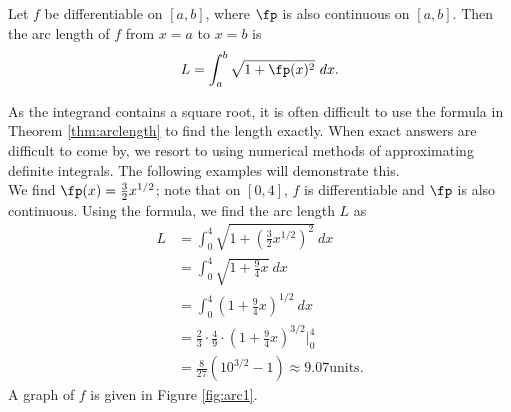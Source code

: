{Let $f$ be differentiable on $[a,b]$, where $\fp$ is also continuous on $[a,b]$. Then the arc length of $f$ from $x=a$ to $x=b$ is
$$L = \int_a^b \sqrt{1+\fp(x)^2}\ dx.$$
}

As the integrand contains a square root, it is often difficult to use the formula in Theorem \ref{thm:arclength} to find the length exactly. When exact answers are difficult to come by, we resort to using numerical methods of approximating definite integrals. The following examples will demonstrate this.\\

{We find $\fp(x)= \frac32x^{1/2}$; note that on $[0,4]$, $f$ is differentiable  and $\fp$ is also continuous. Using the formula, we find the arc length $L$ as
\begin{align*}
	L &=	\int_0^4 \sqrt{1+\left(\frac32x^{1/2}\right)^2}\ dx \\
		&=	\int_0^4 \sqrt{1+\frac94x} \ dx \\
		&= 	\int_0^4 \left(1+\frac94x\right)^{1/2}\ dx \\
		&=  \frac23\cdot\frac49\cdot\left(1+\frac94x\right)^{3/2}\Big|_0^4 \\
		&=\frac{8}{27}\left(10^{3/2}-1\right) \approx 9.07 \text{units}.
\end{align*}
	A graph of $f$ is given in Figure \ref{fig:arc1}. 
}\\

